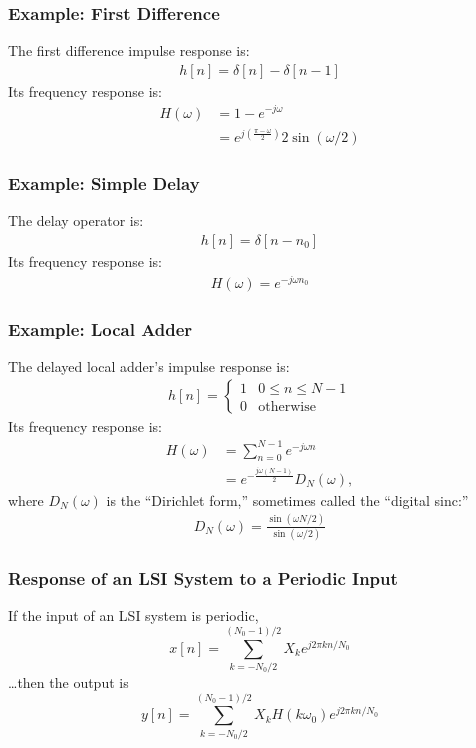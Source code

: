 \documentclass{beamer}
\begin{document}
\begin{frame}
  \frametitle{Example: First Difference}

  The first difference impulse response is:
  \begin{align*}
    h[n] = \delta[n]-\delta[n-1]
  \end{align*}
  Its frequency response is:
  \begin{align*}
    H(\omega) &= 1-e^{-j\omega}\\
    &= e^{j\left(\frac{\pi-\omega}{2}\right)} 2\sin(\omega/2)
  \end{align*}
\end{frame}
  
\begin{frame}
  \frametitle{Example: Simple Delay}

  The delay operator is:
  \begin{align*}
    h[n] = \delta[n-n_0]
  \end{align*}
  Its frequency response is:
  \begin{align*}
    H(\omega) = e^{-j\omega n_0}
  \end{align*}
\end{frame}
  

\begin{frame}
  \frametitle{Example: Local Adder}

  The delayed local adder's impulse response is:
  \begin{align*}
    h[n] = \begin{cases}1 & 0\le n\le N-1\\0&\mbox{otherwise}\end{cases}
  \end{align*}
  Its frequency response is:
  \begin{align*}
    H(\omega) &= \sum_{n=0}^{N-1} e^{-j\omega n}\\
    &= e^{-\frac{j\omega (N-1)}{2}} D_N(\omega),
  \end{align*}
  where $D_N(\omega)$ is the ``Dirichlet form,'' sometimes called the
  ``digital sinc:''
  \begin{align*}
    D_N(\omega) = \frac{\sin(\omega N/2)}{\sin(\omega/2)}
  \end{align*}
\end{frame}

\begin{frame}
  \frametitle{Response of an LSI System to a Periodic Input}
  If the input of an LSI system is periodic,
  \[
  x[n] =\sum_{k=-N_0/2}^{(N_0-1)/2} X_k e^{j2\pi kn/N_0}
  \]
  \ldots then the output is
  \[
  y[n] = \sum_{k=-N_0/2}^{(N_0-1)/2} X_k H(k\omega_0) e^{j2\pi kn/N_0}
  \]
\end{frame}
\end{document}
